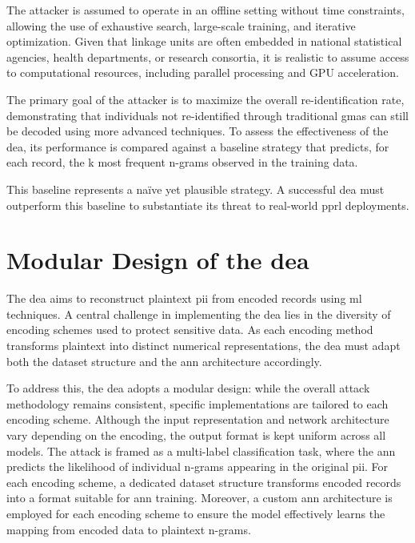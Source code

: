 The attacker is assumed to operate in an offline setting without time constraints, allowing the use of exhaustive search, large-scale training, and iterative optimization.
Given that linkage units are often embedded in national statistical agencies, health departments, or research consortia, it is realistic to assume access to computational resources, including parallel processing and GPU acceleration.

The primary goal of the attacker is to maximize the overall re-identification rate, demonstrating that individuals not re-identified through traditional \ac{gma}s can still be decoded using more advanced techniques.
To assess the effectiveness of the \ac{dea}, its performance is compared against a baseline strategy that predicts, for each record, the k most frequent n-grams observed in the training data.

This baseline represents a naïve yet plausible strategy.
A successful \ac{dea} must outperform this baseline to substantiate its threat to real-world \ac{pprl} deployments.

\section{Modular Design of the \ac{dea}} \label{sec:designandimplementation}

The \ac{dea} aims to reconstruct plaintext \ac{pii} from encoded records using \ac{ml} techniques.
A central challenge in implementing the \ac{dea} lies in the diversity of encoding schemes used to protect sensitive data.
As each encoding method transforms plaintext into distinct numerical representations, the \ac{dea} must adapt both the dataset structure and the \ac{ann} architecture accordingly.

To address this, the \ac{dea} adopts a modular design: while the overall attack methodology remains consistent, specific implementations are tailored to each encoding scheme.
Although the input representation and network architecture vary depending on the encoding, the output format is kept uniform across all models.
The attack is framed as a multi-label classification task, where the \ac{ann} predicts the likelihood of individual n-grams appearing in the original \ac{pii}.
For each encoding scheme, a dedicated dataset structure transforms encoded records into a format suitable for \ac{ann} training.
Moreover, a custom \ac{ann} architecture is employed for each encoding scheme to ensure the model effectively learns the mapping from encoded data to plaintext n-grams.

